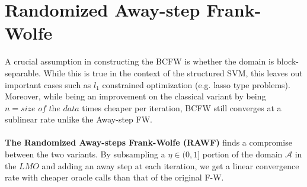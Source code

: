 \documentclass{article}
\begin{document}
\section{Randomized Away-step Frank-Wolfe}
A crucial assumption in constructing the BCFW is whether the domain is block-separable. While this is true in the context of the structured SVM, this leaves out important cases such as $l_{1}$ constrained optimization (e.g. lasso type problems).
\\
Moreover, while being an improvement on the classical variant by being $n=\textit{size of the data}$ times cheaper per iteration, BCFW still converges at a sublinear rate unlike the Away-step FW.\\
\\
\textbf{The Randomized Away-steps Frank-Wolfe (RAWF)} finds a compromise between the two variants. By subsampling a $\eta\in(0,1]$ portion of the domain $\mathcal{A}$ in the $LMO$ and adding an away step at each iteration, we get a linear convergence rate with cheaper oracle calls than that of the original F-W.
\end{document}
